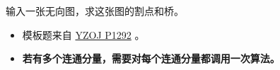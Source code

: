 \noindent 输入一张无向图，求这张图的割点和桥。

\begin{itemize}
    \item 模板题来自 \href{https://oiproxy.bugminer.top/OnlineJudge/problem_show.php?id=1292}{YZOJ P1292} 。
    \item \textbf{若有多个连通分量，需要对每个连通分量都调用一次算法。}
\end{itemize}